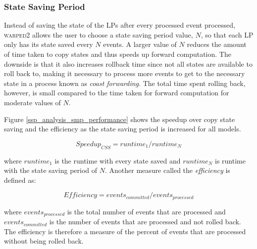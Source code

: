 \documentclass[11pt]{book}
\begin{document}
\subsubsection{State Saving Period}

Instead of saving the state of the LPs after every processed event processed, \textsc{warped2}
allows the user to choose a state saving period value, $N$, so that each LP only has its state
saved every $N$ events. A larger value of $N$ reduces the amount of time taken to copy states
and thus speeds up forward computation. The downside is that it also increases rollback time
since not all states are available to roll back to, making it necessary to process more events to
get to the necessary state in a process known as \emph{coast forwarding}. The total time spent
rolling back, however, is small compared to the time taken for forward computation for moderate
values of $N$.

Figure \ref{ssp_analysis_smp_performance} shows the speedup over copy state saving and the
efficiency as the state saving period is increased for all models.

$$ Speedup_{CSS} = runtime_{1}/runtime_{N} $$

\noindent
where $runtime_{1}$ is the runtime with every state saved and $runtime_{N}$ is runtime with the
state saving period of $N$. Another measure called the \emph{efficiency} is defined as:

$$ Efficiency = {events_{committed}}/{events_{processed}} $$

\noindent
where $events_{processed}$ is the total number of events that are processed and $events_{committed}$
is the number of events that are processed and not rolled back. The efficiency is therefore
a measure of the percent of events that are processed without being rolled back.
\end{document}
